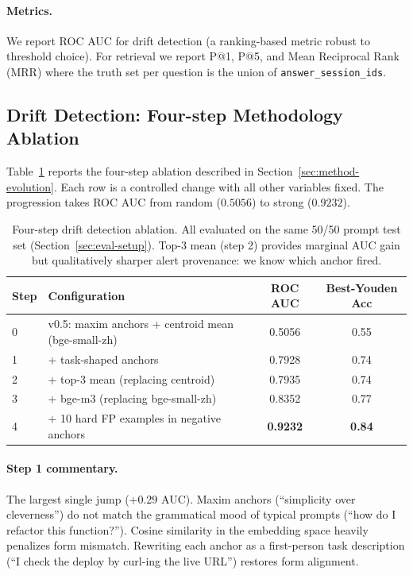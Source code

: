 \paragraph{Metrics.} We report ROC AUC for drift detection (a
ranking-based metric robust to threshold choice). For retrieval
we report P@1, P@5, and Mean Reciprocal Rank (MRR) where the
truth set per question is the union of \texttt{answer\_session\_ids}.

\subsection{Drift Detection: Four-step Methodology Ablation}
\label{sec:eval-drift}

Table~\ref{tab:drift-evolution} reports the four-step ablation
described in Section~\ref{sec:method-evolution}. Each row is a
controlled change with all other variables fixed. The progression
takes ROC AUC from random ($0.5056$) to strong ($0.9232$).

\begin{table}[h]
\centering
\caption{Four-step drift detection ablation. All evaluated on the
same 50/50 prompt test set (Section~\ref{sec:eval-setup}).
Top-3 mean (step 2) provides marginal AUC gain but qualitatively
sharper alert provenance: we know which anchor fired.}
\label{tab:drift-evolution}
\begin{tabular}{llcc}
\toprule
Step & Configuration & ROC AUC & Best-Youden Acc \\
\midrule
0 & v0.5: maxim anchors + centroid mean (bge-small-zh) & 0.5056 & 0.55 \\
1 & + task-shaped anchors                              & 0.7928 & 0.74 \\
2 & + top-3 mean (replacing centroid)                  & 0.7935 & 0.74 \\
3 & + bge-m3 (replacing bge-small-zh)                  & 0.8352 & 0.77 \\
4 & + 10 hard FP examples in negative anchors          & \textbf{0.9232} & \textbf{0.84} \\
\bottomrule
\end{tabular}
\end{table}

\paragraph{Step 1 commentary.}
The largest single jump (+0.29 AUC). Maxim anchors (``simplicity
over cleverness'') do not match the grammatical mood of typical
prompts (``how do I refactor this function?''). Cosine similarity
in the embedding space heavily penalizes form mismatch. Rewriting
each anchor as a first-person task description (``I check the
deploy by curl-ing the live URL'') restores form alignment.

